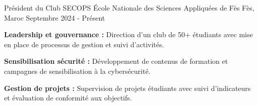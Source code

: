 \begin{cventries}
    \cventry
    {Président du Club SECOPS}
    {École Nationale des Sciences Appliquées de Fès} %
    {Fès, Maroc} %
    {Septembre 2024 - Présent} %
    {
        \begin{cvitems} %
            \item {\textbf{Leadership et gouvernance :} Direction d'un club de 50+ étudiants avec mise en place de processus de gestion et suivi d'activités.}
            \item {\textbf{Sensibilisation sécurité :} Développement de contenus de formation et campagnes de sensibilisation à la cybersécurité.}
            \item {\textbf{Gestion de projets :} Supervision de projets étudiants avec suivi d'indicateurs et évaluation de conformité aux objectifs.}
        \end{cvitems}
    }
\end{cventries}